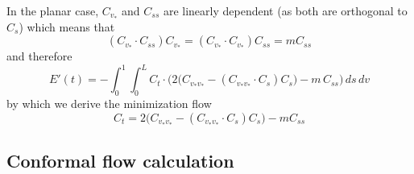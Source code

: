 \documentclass[twoside,a4paper,english]{article}
\def\v{{v_*}}
\begin{document}
In the planar case, $C_{\v}$ and $C_{ss}$ are linearly dependent
(as both are orthogonal to $C_s$) which means that
\begin{equation}
  (C_{\v}\cdot C_{ss})C_{\v}=(C_{\v}\cdot C_{\v})C_{ss}=mC_{ss}
\end{equation}
and therefore
\begin{equation}
E'(t)=
  -\int_0^1\int_0^L
    C_t\cdot\Big(
      2\big(C_{\v\v}-(C_{\v\v}\cdot C_s)C_s\big)-m\,C_{ss}
    \Big)
  \,ds\,dv
\end{equation}
by which we derive the minimization flow 
\[  C_t = 2\big(C_{\v\v}-(C_{\v\v}\cdot C_s)C_s\big) - m C_{ss}\]


\subsection{Conformal flow calculation}
\end{document}
